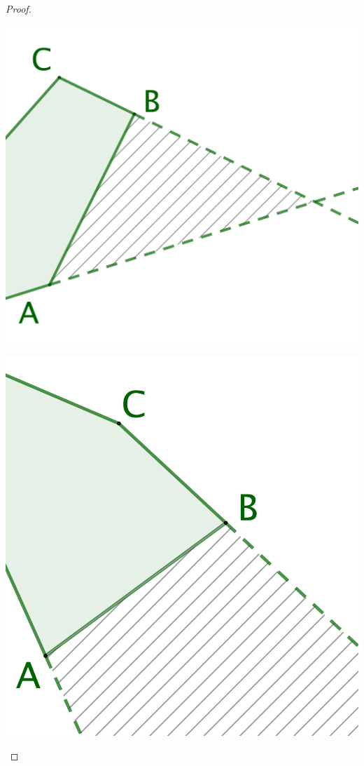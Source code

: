 \begin{proof}
\begin{itemize}
\begin{multicols}{2}
            \includegraphics[scale=.35]{add-vertex-1.png}

            \includegraphics[scale=.35]{add-vertex-2.png}
        \end{multicols}



\end{itemize}
\end{proof}
